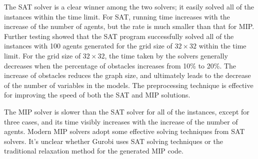 \documentclass[conference]{IEEEtran}
\begin{document}
The SAT solver is a clear winner among the two solvers; it easily solved all of the instances within the time limit. For SAT, running time increases with the increase of the number of agents, but the rate is much smaller than that for MIP. Further testing showed that the SAT program successfully solved all of the instances with 100 agents generated for the grid size of $32\times 32$ within the time limit. For the grid size of $32\times 32$, the time taken by the solvers generally decreases when the percentage of obstacles increases from 10\% to 20\%. The increase of obstacles reduces the graph size, and ultimately leads to the decrease of the number of variables in the models. The preprocessing technique is effective for improving the speed of both the SAT and MIP solutions.

The MIP solver is slower than the SAT solver for all of the instances, except for three cases, and its time visibly increases with the increase of the number of agents. Modern MIP solvers adopt some effective solving techniques from SAT solvers. It's unclear whether Gurobi uses SAT solving techniques or the traditional relaxation method for the generated MIP code.
\end{document}
